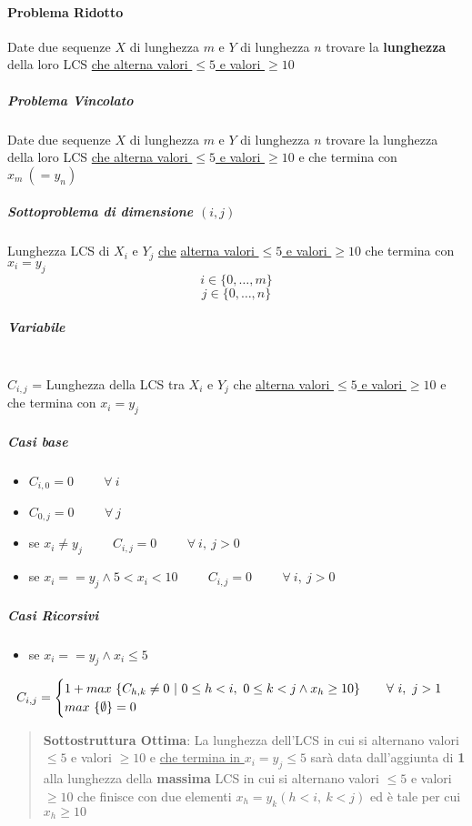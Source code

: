 \documentclass[12pt]{article}
\begin{document}
\paragraph{Problema Ridotto}
Date due sequenze $X$ di lunghezza $m$ e $Y$ di lunghezza $n$ trovare la \textbf{lunghezza} della loro LCS \underline{che alterna valori $\leq 5$ e valori $\geq 10$}
\subparagraph{Problema Vincolato}
Date due sequenze $X$ di lunghezza $m$ e $Y$ di lunghezza $n$ trovare la lunghezza della loro LCS \underline{che alterna valori $\leq 5$ e valori } \underline{$\geq 10$} e che termina con $x_m \ (=y_n)$
\subparagraph{Sottoproblema di dimensione $(i, j)$}
Lunghezza LCS di $X_i$ e $Y_j$ \underline{che} \underline{alterna valori $\leq 5$ e valori $\geq 10$} che termina con $x_i = y_j$
$$i \in \{0, \dots, m\}$$
$$j \in \{0, \dots, n\}$$
\subparagraph{Variabile}\mbox{}\\
$C_{i,j}$ = Lunghezza della LCS tra $X_i$ e $Y_j$ che \underline{alterna valori $\leq 5$ e valori $\geq 10$} e che termina con $x_i = y_j$
\subparagraph{Casi base}
\begin{itemize}
    \item $C_{i,0}=0 \hspace{1cm} \forall \ i$
    \item $C_{0,j}=0 \hspace{1cm} \forall \ j$
    \item se $x_i \neq y_j \hspace{1cm} C_{i,j}=0 \hspace{1cm} \forall \ i, \ j > 0$
    \item se $x_i == y_j \land 5<x_i<10 \hspace{1cm} C_{i,j}=0 \hspace{1cm} \forall \ i, \ j > 0$
\end{itemize}
\subparagraph{Casi Ricorsivi}
\begin{itemize}
    \item se $x_i == y_j \land x_i\leq 5 $
\end{itemize}
\[
    C_{i, j}=\begin{cases}
        1 + max \ \{C_{h, k}\neq 0 \ | \ 0 \leq h<i, \ 0 \leq k<j \land x_h \geq 10\}$ \hspace{0.5cm} $\forall \ i, \ j>1 \\
        max \ \{\emptyset\} = 0
    \end{cases}
\]
\begin{quote}
    \textbf{Sottostruttura Ottima}: La lunghezza dell'LCS in cui si alternano valori $\leq 5$ e valori $\geq 10$ e \underline{che termina in $x_i = y_j \leq 5$} sarà data dall'aggiunta di \textbf{1} alla lunghezza della \textbf{massima} LCS in cui si alternano valori $\leq 5$ e valori $\geq 10$ che finisce con due elementi $x_h=y_k (h<i, \ k<j)$ ed è tale per cui $x_h \geq 10$
\end{quote}
\end{document}
